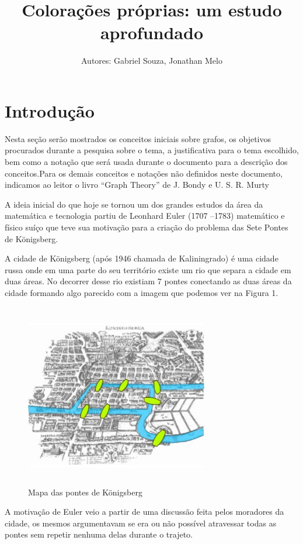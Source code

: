 \documentclass[12pt]{article}
\title{Colorações próprias: um estudo aprofundado}
\author{Autores: Gabriel Souza, Jonathan Melo}
\affil{Orientador: Prof. Celso A. Weffort-Santos }
\begin{document}
	
	\maketitle
	
	\section{Introdução}
	Nesta seção serão mostrados os conceitos iniciais sobre grafos, os objetivos procurados durante a pesquisa sobre o tema, a justificativa para o tema escolhido, bem como a notação que será usada durante o documento para a descrição dos conceitos.Para os demais conceitos e notações não definidos neste documento, indicamos ao leitor o livro ``Graph Theory'' de J. Bondy e U. S. R. Murty~\cite{BondyM08}
	
	A ideia inicial do que hoje se tornou um dos grandes estudos da área da matemática e tecnologia partiu de Leonhard Euler (1707 –1783) matemático e físico suíço que teve sua motivação para a criação do problema das Sete Pontes de Königsberg.
	
	A cidade de Königsberg (após 1946 chamada de Kaliningrado) é uma cidade russa onde em uma parte do seu território existe um rio que separa a cidade em duas áreas. No decorrer desse rio existiam 7 pontes conectando as duas áreas da cidade formando algo parecido com a imagem que podemos ver na Figura 1.
	
	\begin{figure}[!htb]
		\centering
		\includegraphics[width=8cm, height=8cm]{pontesKonisberg}
		\caption{Mapa das pontes de Königsberg}    
	\end{figure}
	
	A motivação de Euler veio a partir de uma discussão feita pelos moradores da cidade, os mesmos argumentavam se era ou não possível atravessar todas as pontes sem repetir nenhuma delas durante o trajeto.
	
\end{document}
